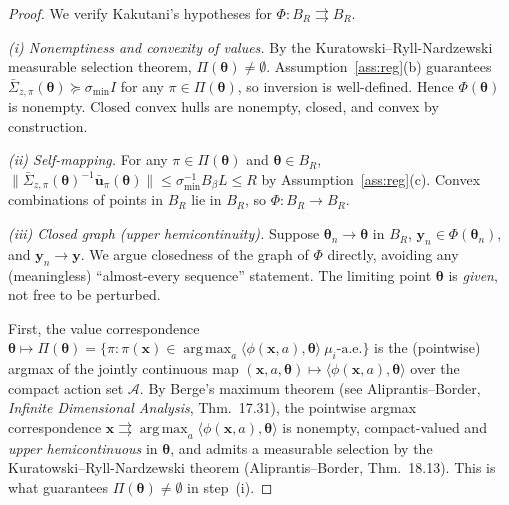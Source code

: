 \documentclass[11pt]{article}
\DeclareMathOperator*{\argmax}{arg\,max}
\begin{document}
\begin{proof}
We verify Kakutani's hypotheses for $\Phi:B_R\rightrightarrows B_R$.

\emph{(i) Nonemptiness and convexity of values.}  By the
Kuratowski--Ryll-Nardzewski measurable selection theorem,
$\Pi(\bm{\theta})\neq\emptyset$.
Assumption~\ref{ass:reg}(b) guarantees
$\bar{\Sigma}_{z,\pi}(\bm{\theta})\succeq\sigma_{\min}I$
for any $\pi\in\Pi(\bm{\theta})$, so inversion is well-defined.
Hence $\Phi(\bm{\theta})$ is nonempty. Closed convex hulls are
nonempty, closed, and convex by construction.

\emph{(ii) Self-mapping.}  For any $\pi\in\Pi(\bm{\theta})$ and
$\bm{\theta}\in B_R$,
$\|\bar{\Sigma}_{z,\pi}(\bm{\theta})^{-1}\bar{\bm{u}}_\pi(\bm{\theta})\|
\leq\sigma_{\min}^{-1}B_\beta L\leq R$
by Assumption~\ref{ass:reg}(c).
Convex combinations of points in $B_R$ lie in $B_R$, so $\Phi:B_R\to B_R$.

\emph{(iii) Closed graph (upper hemicontinuity).}  Suppose
$\bm{\theta}_n\to\bm{\theta}$ in $B_R$, $\bm{y}_n\in\Phi(\bm{\theta}_n)$,
and $\bm{y}_n\to\bm{y}$.  We argue closedness of the graph of $\Phi$
directly, avoiding any (meaningless) ``almost-every sequence''
statement. The limiting point $\bm{\theta}$ is \emph{given}, not free
to be perturbed.

First, the value correspondence
$\bm{\theta}\mapsto\Pi(\bm{\theta})=\{\pi:\pi(\bm{x})\in
\argmax_a\langle\phi(\bm{x},a),\bm{\theta}\rangle\ \mu_i\text{-a.e.}\}$
is the (pointwise) argmax of the jointly continuous map
$(\bm{x},a,\bm{\theta})\mapsto\langle\phi(\bm{x},a),\bm{\theta}\rangle$
over the compact action set $\mathcal{A}$.  By Berge's maximum theorem
(see Aliprantis--Border, \emph{Infinite Dimensional Analysis},
Thm.~17.31), the pointwise argmax correspondence
$\bm{x}\rightrightarrows\argmax_a\langle\phi(\bm{x},a),\bm{\theta}\rangle$
is nonempty, compact-valued and \emph{upper hemicontinuous} in
$\bm{\theta}$, and admits a measurable selection by the
Kuratowski--Ryll-Nardzewski theorem (Aliprantis--Border,
Thm.~18.13).  This is what guarantees $\Pi(\bm{\theta})\neq\emptyset$ in
step~(i).


\end{proof}
\end{document}
